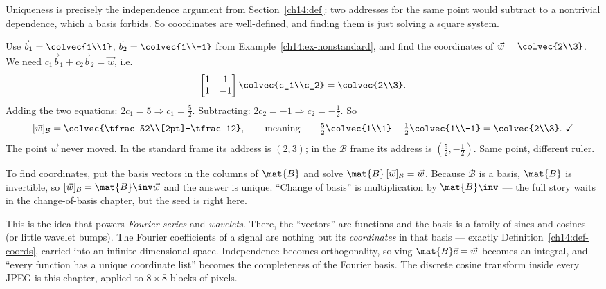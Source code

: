 Uniqueness is precisely the independence argument from Section~\ref{ch14:def}: two
addresses for the same point would subtract to a nontrivial dependence, which a
basis forbids. So coordinates are well-defined, and finding them is just solving a
square system.

\begin{example}
\label{ch14:ex-coords}
Use $\vec{b}_1 = \colvec{1\\1}$, $\vec{b}_2 = \colvec{1\\-1}$ from
Example~\ref{ch14:ex-nonstandard}, and find the coordinates of $\vec{w} =
\colvec{2\\3}$. We need $c_1\vec{b}_1 + c_2\vec{b}_2 = \vec{w}$, i.e.
\[
  \begin{bmatrix} 1 & 1\\ 1 & -1\end{bmatrix}\colvec{c_1\\c_2} = \colvec{2\\3}.
\]
Adding the two equations: $2c_1 = 5 \Rightarrow c_1 = \tfrac52$. Subtracting:
$2c_2 = -1 \Rightarrow c_2 = -\tfrac12$. So
\[
  [\vec{w}]_{\mathcal B} = \colvec{\tfrac52\\[2pt]-\tfrac12},
  \qquad\text{meaning}\qquad
  \tfrac52\colvec{1\\1} - \tfrac12\colvec{1\\-1} = \colvec{2\\3}.\ \checkmark
\]
The point $\vec{w}$ never moved. In the standard frame its address is $(2,3)$; in
the $\mathcal B$ frame its address is $(\tfrac52,-\tfrac12)$. Same point, different
ruler.
\end{example}

\begin{focusbox}
To find coordinates, put the basis vectors in the columns of $\mat{B}$ and solve
$\mat{B}\,[\vec{w}]_{\mathcal B} = \vec{w}$. Because $\mathcal B$ is a basis,
$\mat{B}$ is invertible, so $[\vec{w}]_{\mathcal B} = \mat{B}\inv\vec{w}$ and the
answer is unique. ``Change of basis'' is multiplication by $\mat{B}\inv$ ---
the full story waits in the change-of-basis chapter, but the seed is right here.
\end{focusbox}

\begin{connectionbox}
This is the idea that powers \emph{Fourier series} and \emph{wavelets}. There, the
``vectors'' are functions and the basis is a family of sines and cosines (or
little wavelet bumps). The Fourier coefficients of a signal are nothing but its
\emph{coordinates} in that basis --- exactly Definition~\ref{ch14:def-coords},
carried into an infinite-dimensional space. Independence becomes orthogonality,
solving $\mat{B}\vec{c}=\vec{w}$ becomes an integral, and ``every function has a
unique coordinate list'' becomes the completeness of the Fourier basis. The
discrete cosine transform inside every JPEG is this chapter, applied to
$8\times 8$ blocks of pixels.
\end{connectionbox}


